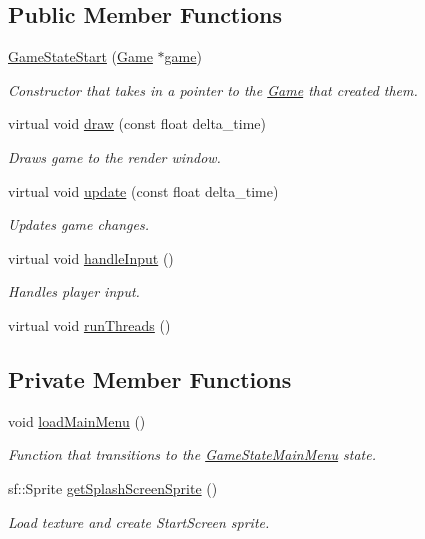 \subsection*{Public Member Functions}
\begin{DoxyCompactItemize}
\item 
\hyperlink{class_game_state_start_a2477272c214e48d260bda72150c21ef8}{Game\+State\+Start} (\hyperlink{class_game}{Game} $\ast$\hyperlink{class_game_state_a355a79415b9ef63c2aec1448a99f6e71}{game})
\begin{DoxyCompactList}\small\item\em Constructor that takes in a pointer to the \hyperlink{class_game}{Game} that created them. \end{DoxyCompactList}\item 
virtual void \hyperlink{class_game_state_start_a0969e5227b6f2eaabd53ee69f32a37e7}{draw} (const float delta\+\_\+time)
\begin{DoxyCompactList}\small\item\em Draws game to the render window. \end{DoxyCompactList}\item 
virtual void \hyperlink{class_game_state_start_a6a57f1c6f34ea789cb9ebf8935350627}{update} (const float delta\+\_\+time)
\begin{DoxyCompactList}\small\item\em Updates game changes. \end{DoxyCompactList}\item 
virtual void \hyperlink{class_game_state_start_afa9da08e1a51b4914ee436e7f1c4f6e6}{handle\+Input} ()
\begin{DoxyCompactList}\small\item\em Handles player input. \end{DoxyCompactList}\item 
virtual void \hyperlink{class_game_state_start_ac9514695cbd6366c721e9057aca970fe}{run\+Threads} ()
\end{DoxyCompactItemize}
\subsection*{Private Member Functions}
\begin{DoxyCompactItemize}
\item 
void \hyperlink{class_game_state_start_abf9604839c31d8b48f3cdccb79f370e5}{load\+Main\+Menu} ()
\begin{DoxyCompactList}\small\item\em Function that transitions to the \hyperlink{class_game_state_main_menu}{Game\+State\+Main\+Menu} state. \end{DoxyCompactList}\item 
sf\+::\+Sprite \hyperlink{class_game_state_start_aca967324121e7e404a2f411102f186ac}{get\+Splash\+Screen\+Sprite} ()
\begin{DoxyCompactList}\small\item\em Load texture and create Start\+Screen sprite. \end{DoxyCompactList}\end{DoxyCompactItemize}
